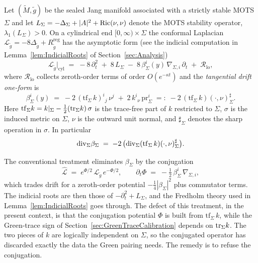 Let $(\widetilde M,\widetilde g)$ be the sealed Jang manifold associated with a strictly stable MOTS $\Sigma$ and let $L_\Sigma=-\Delta_\Sigma+|A|^2+\mathrm{Ric}(\nu,\nu)$ denote the MOTS stability operator, $\lambda_1(L_\Sigma)>0$. On a cylindrical end $[0,\infty)\times\Sigma$ the conformal Laplacian $\mathcal L_{\widetilde g}=-8\Delta_{\widetilde g}+R_{\widetilde g}^{\mathrm{reg}}$ has the asymptotic form (see the indicial computation in Lemma~\ref{lem:IndicialRoots} of Section~\ref{sec:Analysis})
\begin{equation}\label{eq:DriftLichnerowicz}
    \mathcal L_{\widetilde g}\big|_{\mathrm{cyl}}
    \;=\;
    -8\,\partial_t^2
    \;+\;8\,L_\Sigma
    \;-\;8\,\beta_\Sigma^i(y)\,\nabla_{\!\Sigma,i}\,\partial_t
    \;+\;\mathcal R_{\mathrm{lo}} ,
\end{equation}
where $\mathcal R_{\mathrm{lo}}$ collects zeroth-order terms of order $O(e^{-\kappa t})$ and the \emph{tangential drift one-form} is
\begin{equation}\label{eq:DriftOneForm}
    \beta_\Sigma^i(y)\;=\;-2\,(\mathrm{tf}_\Sigma\,k)^i{}_j\,\nu^j\;+\;2\,k^i{}_\nu\,\mathrm{pr}_\Sigma^i
    \;=:\;-2\,(\mathrm{tf}_\Sigma\,k)(\cdot,\nu)^\sharp_{
    \Sigma} .
\end{equation}
Here $\mathrm{tf}_\Sigma k = k|_\Sigma - \tfrac12(\mathrm{tr}_\Sigma k)\,\sigma$ is the trace-free part of $k$ restricted to $\Sigma$, $\sigma$ is the induced metric on $\Sigma$, $\nu$ is the outward unit normal, and $\sharp_\Sigma$ denotes the sharp operation in $\sigma$. In particular
\begin{equation}\label{eq:DriftDivergence}
    \mathrm{div}_\Sigma \beta_\Sigma \;=\; -2\,\bigl(\mathrm{div}_\Sigma(\mathrm{tf}_\Sigma\,k)(\cdot,\nu)^\sharp_{
    \Sigma}\bigr) .
\end{equation}

The conventional treatment eliminates $\beta_\Sigma$ by the conjugation
\begin{equation}\label{eq:StandardConjugation}
    \widehat{\mathcal L}\;=\;e^{\Phi/2}\,\mathcal L_{\widetilde g}\,e^{-\Phi/2},
    \qquad
    \partial_t\Phi \;=\; -\tfrac12\,\beta_\Sigma^i\,\nabla_{\!\Sigma,i},
\end{equation}
which trades drift for a zeroth-order potential $-\tfrac14|\beta_\Sigma|^2$ plus commutator terms. The indicial roots are then those of $-\partial_t^2+L_\Sigma$, and the Fredholm theory used in Lemma~\ref{lem:IndicialRoots} goes through. The defect of this treatment, in the present context, is that the conjugation potential $\Phi$ is built from $\mathrm{tf}_\Sigma\,k$, while the Green-trace sign of Section~\ref{sec:GreenTraceCalibration} depends on $\mathrm{tr}_\Sigma k$. The two pieces of $k$ are logically independent on $\Sigma$, so the conjugated operator has discarded exactly the data the Green pairing needs. The remedy is to refuse the conjugation.

